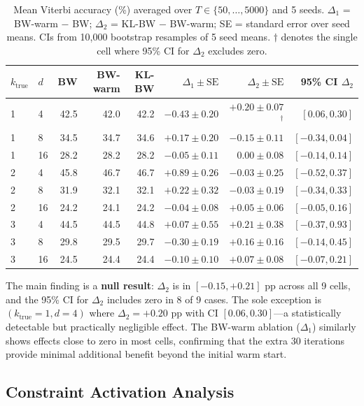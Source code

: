 \documentclass[11pt,letterpaper]{article}
\begin{document}
\begin{table}[h]
\centering
\caption{Mean Viterbi accuracy (\%) averaged over $T \in \{50,\ldots,5000\}$ and 5 seeds. $\Delta_1$ = BW-warm $-$ BW;
$\Delta_2$ = KL-BW $-$ BW-warm; SE = standard error over seed means. CIs from 10,000 bootstrap resamples of 5 seed means.
$\dagger$ denotes the single cell where 95\% CI for $\Delta_2$ excludes zero.}
\label{tab:main}
\small
\begin{tabular}{llrrrrrr}
\toprule
$k_\text{true}$ & $d$ & BW & BW-warm & KL-BW & $\Delta_1 \pm \text{SE}$ & $\Delta_2 \pm \text{SE}$ & 95\% CI $\Delta_2$ \\
\midrule
1 & 4  & 42.5 & 42.0 & 42.2 & $-0.43\pm0.20$ & $+0.20\pm0.07$$^\dagger$ & $[0.06, 0.30]$ \\
1 & 8  & 34.5 & 34.7 & 34.6 & $+0.17\pm0.20$ & $-0.15\pm0.11$ & $[-0.34, 0.04]$ \\
1 & 16 & 28.2 & 28.2 & 28.2 & $-0.05\pm0.11$ & $0.00\pm0.08$ & $[-0.14, 0.14]$ \\
2 & 4  & 45.8 & 46.7 & 46.7 & $+0.89\pm0.26$ & $-0.03\pm0.25$ & $[-0.52, 0.37]$ \\
2 & 8  & 31.9 & 32.1 & 32.1 & $+0.22\pm0.32$ & $-0.03\pm0.19$ & $[-0.34, 0.33]$ \\
2 & 16 & 24.2 & 24.1 & 24.2 & $-0.04\pm0.08$ & $+0.05\pm0.06$ & $[-0.05, 0.16]$ \\
3 & 4  & 44.5 & 44.5 & 44.8 & $+0.07\pm0.55$ & $+0.21\pm0.38$ & $[-0.37, 0.93]$ \\
3 & 8  & 29.8 & 29.5 & 29.7 & $-0.30\pm0.19$ & $+0.16\pm0.16$ & $[-0.14, 0.45]$ \\
3 & 16 & 24.5 & 24.4 & 24.4 & $-0.10\pm0.10$ & $+0.07\pm0.08$ & $[-0.07, 0.21]$ \\
\bottomrule
\end{tabular}
\end{table}

The main finding is a \textbf{null result}: $\Delta_2$ is in $[-0.15, +0.21]$ pp across all 9 cells, and the 95\% CI for
$\Delta_2$ includes zero in 8 of 9 cases. The sole exception is $(k_\text{true}=1, d=4)$ where $\Delta_2 = +0.20$ pp with
CI $[0.06, 0.30]$---a statistically detectable but practically negligible effect. The BW-warm ablation ($\Delta_1$)
similarly shows effects close to zero in most cells, confirming that the extra 30 iterations provide minimal additional
benefit beyond the initial warm start.

\subsection{Constraint Activation Analysis}
\end{document}
